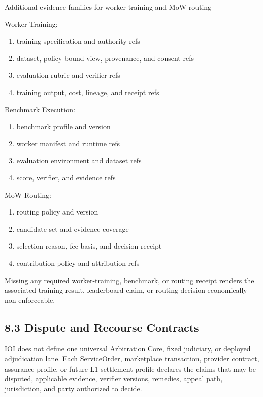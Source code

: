 \documentclass[
  11pt,
]{article}
\providecommand{\tightlist}{%
  \setlength{\itemsep}{0pt}\setlength{\parskip}{0pt}}
\begin{document}
Additional evidence families for worker training and MoW routing

Worker Training:

\begin{enumerate}
\def\labelenumi{\arabic{enumi}.}
\tightlist
\item
  training specification and authority refs
\item
  dataset, policy-bound view, provenance, and consent refs
\item
  evaluation rubric and verifier refs
\item
  training output, cost, lineage, and receipt refs
\end{enumerate}

Benchmark Execution:

\begin{enumerate}
\def\labelenumi{\arabic{enumi}.}
\tightlist
\item
  benchmark profile and version
\item
  worker manifest and runtime refs
\item
  evaluation environment and dataset refs
\item
  score, verifier, and evidence refs
\end{enumerate}

MoW Routing:

\begin{enumerate}
\def\labelenumi{\arabic{enumi}.}
\tightlist
\item
  routing policy and version
\item
  candidate set and evidence coverage
\item
  selection reason, fee basis, and decision receipt
\item
  contribution policy and attribution refs
\end{enumerate}

Missing any required worker-training, benchmark, or routing receipt
renders the associated training result, leaderboard claim, or routing
decision economically non-enforceable.

\hypertarget{dispute-and-recourse-contracts}{%
\subsection{8.3 Dispute and Recourse
Contracts}\label{dispute-and-recourse-contracts}}

IOI does not define one universal Arbitration Core, fixed judiciary, or
deployed adjudication lane. Each ServiceOrder, marketplace transaction,
provider contract, assurance profile, or future L1 settlement profile declares
the claims that may be disputed, applicable evidence, verifier versions,
remedies, appeal path, jurisdiction, and party authorized to decide.
\end{document}
